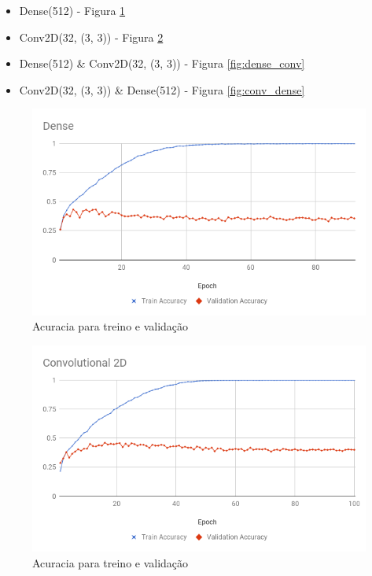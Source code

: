 \documentclass[conference]{IEEEtran}
\begin{document}
\begin{itemize}
	\item Dense(512) - Figura \ref{fig:dense}
	\item Conv2D(32, (3, 3)) - Figura \ref{fig:conv}
	\item Dense(512) \& Conv2D(32, (3, 3)) - Figura \ref{fig:dense_conv}
	\item Conv2D(32, (3, 3)) \& Dense(512) - Figura \ref{fig:conv_dense}
\end{itemize}

\begin{figure}[h!]
	\includegraphics[scale=0.4]{dense.png}
	\caption{Acuracia para treino e validação}
	\label{fig:dense}
\end{figure}

\begin{figure}[h!]
	\includegraphics[scale=0.4]{conv.png}
	\caption{Acuracia para treino e validação}
	\label{fig:conv}
\end{figure}
\end{document}
